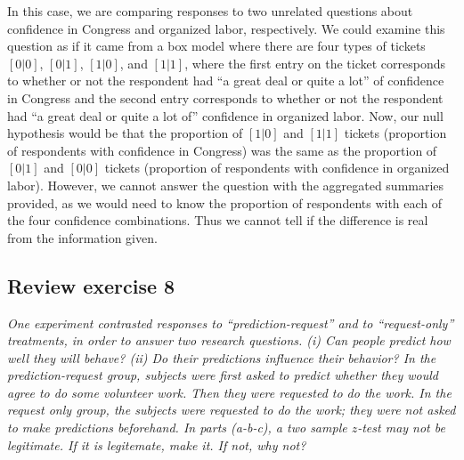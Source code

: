 \documentclass[11pt]{article}
\begin{document}
\noindent In this case, we are comparing responses to two unrelated questions about confidence in Congress and organized labor, respectively. We could examine this question as if it came from a box model where there are four types of tickets $ [0|0] $, $ [0|1] $, $ [1|0] $, and $ [1|1] $, where the first entry on the ticket corresponds to whether or not the respondent had ``a great deal or quite a lot'' of confidence in Congress and the second entry corresponds to whether or not the respondent had ``a great deal or quite a lot of'' confidence in organized labor. Now, our null hypothesis would be that the proportion of $[1|0]$ and $[1|1]$ tickets (proportion of respondents with confidence in Congress) was the same as the proportion of $[0|1]$ and $[0|0]$ tickets (proportion of respondents with confidence in organized labor). However, we cannot answer the question with the aggregated summaries provided, as we would need to know the proportion of respondents with each of the four confidence combinations. Thus we cannot tell if the difference is real from the information given.
%




\subsection*{Review exercise 8} %
\noindent \textit{One experiment contrasted responses to ``prediction-request'' and to ``request-only'' treatments, in order to answer two research questions. (i) Can people predict how well they will behave? (ii) Do their predictions influence their behavior? In the prediction-request group, subjects were first asked to predict whether they would agree to do some volunteer work. Then they were requested to do the work. In the request only group, the subjects were requested to do the work; they were not asked to make predictions beforehand. In parts (a-b-c), a two sample $z$-test may not be legitimate. If it is legitemate, make it. If not, why not?}
\end{document}
